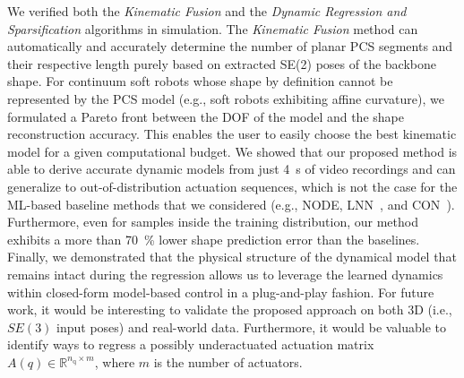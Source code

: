 We verified both the \emph{Kinematic Fusion} and the \emph{Dynamic Regression and Sparsification} algorithms in simulation. The \emph{Kinematic Fusion} method can automatically and accurately determine the number of planar \gls{PCS} segments and their respective length purely based on extracted SE(2) poses of the backbone shape. 
For continuum soft robots whose shape by definition cannot be represented by the \gls{PCS} model (e.g., soft robots exhibiting affine curvature), we formulated a Pareto front between the \gls{DOF} of the model and the shape reconstruction accuracy. This enables the user to easily choose the best kinematic model for a given computational budget.
We showed that our proposed method is able to derive accurate dynamic models from just \SI{4}{s} of video recordings and can generalize to out-of-distribution actuation sequences, which is not the case for the \gls{ML}-based baseline methods that we considered (e.g., \gls{NODE}, \gls{LNN}~\cite{liu2024physics}, and \gls{CON}~\cite{stolzle2024input}).
Furthermore, even for samples inside the training distribution, our method exhibits a more than \SI{70}{\percent} lower shape prediction error than the baselines.
Finally, we demonstrated that the physical structure of the dynamical model that remains intact during the regression allows us to leverage the learned dynamics within closed-form model-based control in a plug-and-play fashion.
For future work, it would be interesting to validate the proposed approach on both 3D (i.e., $SE(3)$ input poses) and real-world data. Furthermore, it would be valuable to identify ways to regress a possibly underactuated actuation matrix $A(q) \in \mathbb{R}^{n_\mathrm{q} \times m}$, where $m$ is the number of actuators.